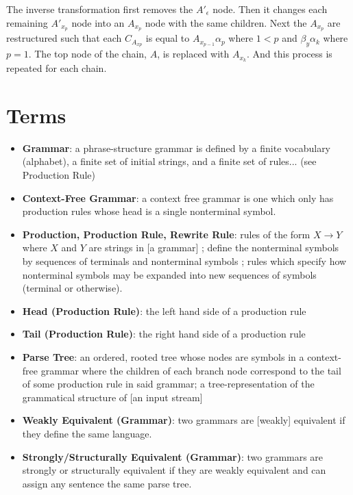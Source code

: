 \documentclass[11pt]{article}
\begin{document}
The inverse transformation first removes the $A'_\epsilon$ node. Then it changes each remaining $A'_{x_p}$ node into an $A_{x_p}$ node
with the same children. Next the $A_{x_p}$ are restructured such that each $C_{A_{x p}}$
is equal to $A_{x_{p-1}} \alpha_p$ where $1 < p$ and $\beta_y \alpha_k$ where $p=1$. The top node of the chain, 
$A$, is replaced with $A_{x_k}$. And this process is repeated for each chain.



\clearpage

\section*{Terms}

\begin{itemize}
\item \textbf{Grammar}: a phrase-structure grammar is defined by a finite vocabulary (alphabet), a finite set of
initial strings, and a finite set of rules... \cite{chomsky} (see Production Rule)
\item \textbf{Context-Free Grammar}: a context free grammar is one which only has production rules whose head is a single nonterminal symbol.
\cite{compiler, anatomy, formal_langs}
\item \textbf{Production, Production Rule, Rewrite Rule}: rules of the form $X \rightarrow Y$ where
$X$ and $Y$ are strings in [a grammar]  \cite{chomsky};
define the nonterminal symbols by sequences of terminals and nonterminal symbols \cite{compiler};
rules which specify how nonterminal symbols may be expanded into new sequences of symbols (terminal or otherwise).
\item \textbf{Head (Production Rule)}: the left hand side of a production rule
\item \textbf{Tail (Production Rule)}: the right hand side of a production rule
\item \textbf{Parse Tree}: an ordered, rooted tree whose nodes are symbols in a context-free grammar where the 
children of each branch node correspond to the tail of some production rule in said grammar;
a tree-representation of the grammatical structure of [an input stream] \cite{anatomy}
\item \textbf{Weakly Equivalent (Grammar)}: two grammars are [weakly] equivalent if they define the same language.\cite{reghizzi}
\item \textbf{Strongly/Structurally Equivalent (Grammar)}: two grammars are strongly or structurally equivalent
if they are weakly equivalent and can assign any sentence the same parse tree. \cite{reghizzi}
\end{itemize}

{}

\end{document}
